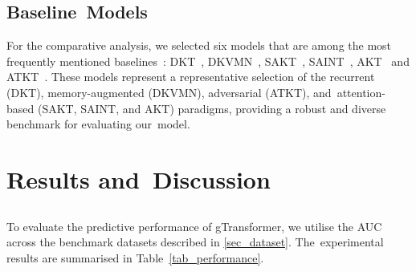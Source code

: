 \documentclass[applsci,article,accept,moreauthors,pdftex]{Definitions/mdpi}
\begin{document}
\subsection{Baseline~Models}\label{sec_models}

For the comparative analysis, we selected six models that are among the most frequently mentioned baselines~\citep{liu2022pykt}: DKT~\citep{piech2015deep}, DKVMN~\citep{zhang2017dynamic}, SAKT~\citep{pandey2019self}, SAINT~\citep{choi2020towards}, AKT~\citep{ghosh2020context} and ATKT~\citep{GuoHZTL21}. These models represent a representative selection of the recurrent (DKT), memory-augmented (DKVMN), adversarial (ATKT), and~attention-based (SAKT, SAINT, and AKT) paradigms, providing a robust and diverse benchmark for evaluating our~model.

\section{Results and~Discussion} \label{sec_results}
\unskip


\subsection{\texorpdfstring{\protect{}}{Performance--Interpretability Trade-Off (RQ1)}} \label{sec_tradeoff}

To evaluate the predictive performance of gTransformer, we utilise the AUC across the benchmark datasets described in \cref{sec_dataset}. The~experimental results are summarised in Table~\ref{tab_performance}.
\end{document}
